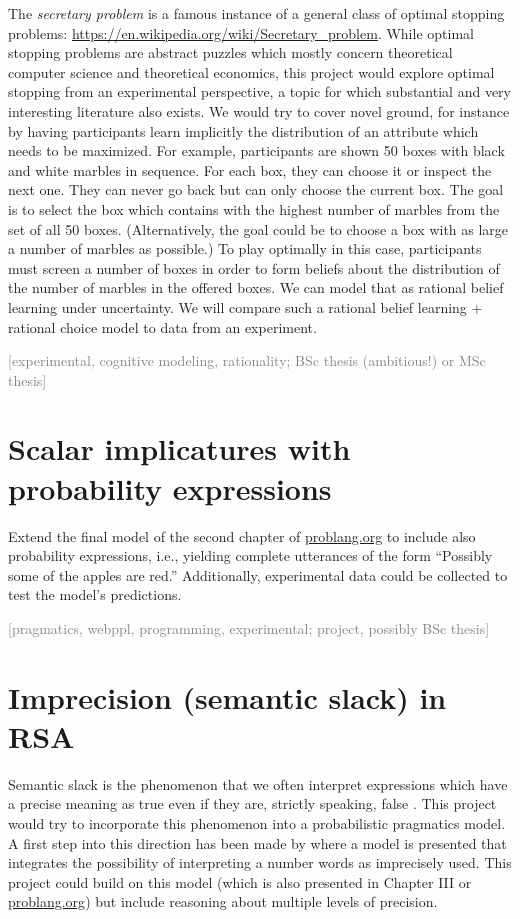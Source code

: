 \documentclass[fleqn,reqno,10pt]{article}
\newcommand{\scope}[1]{\hfill\textcolor{gray}{[#1]}}
\begin{document}
The \emph{secretary problem} is a famous instance of a general class of optimal stopping
problems: \url{https://en.wikipedia.org/wiki/Secretary_problem}. While optimal stopping
problems are abstract puzzles which mostly concern theoretical computer science and theoretical
economics, this project would explore optimal stopping from an experimental perspective, a
topic for which substantial and very interesting literature also exists. We would try to cover
novel ground, for instance by having participants learn implicitly the distribution of an
attribute which needs to be maximized. For example, participants are shown 50 boxes with black
and white marbles in sequence. For each box, they can choose it or inspect the next one. They
can never go back but can only choose the current box. The goal is to select the box which
contains with the highest number of marbles from the set of all 50 boxes. (Alternatively, the
goal could be to choose a box with as large a number of marbles as possible.) To play optimally
in this case, participants must screen a number of boxes in order to form beliefs about the
distribution of the number of marbles in the offered boxes. We can model that as rational
belief learning under uncertainty. We will compare such a rational belief learning + rational
choice model to data from an experiment.

\scope{experimental, cognitive modeling, rationality; BSc thesis (ambitious!) or MSc thesis}

\section{Scalar implicatures with probability expressions}

Extend the final model of the second chapter of \url{problang.org} to include also probability
expressions, i.e., yielding complete utterances of the form ``Possibly some of the apples are
red.'' Additionally, experimental data could be collected to test the model's predictions.

\scope{pragmatics, webppl, programming, experimental; project, possibly BSc thesis}

\section{Imprecision (semantic slack) in RSA}

Semantic slack is the phenomenon that we often interpret expressions which have a precise
meaning as true even if they are, strictly speaking, false
\citep[e.g.][]{Bach1994:Semantic-Slack:,Lasersohn1999:Pragmatic-Halos,Krifka2002:Be-Brief-and-Va,Krifka2007:Approximate-Int}.
This project would try to incorporate this phenomenon into a probabilistic pragmatics model. A
first step into this direction has been made by \citet{KaoWu2014:Nonliteral-Unde} where a model
is presented that integrates the possibility of interpreting a number words as imprecisely
used. This project could build on this model (which is also presented in Chapter III or
\url{problang.org}) but include reasoning about multiple levels of precision. 
\end{document}
